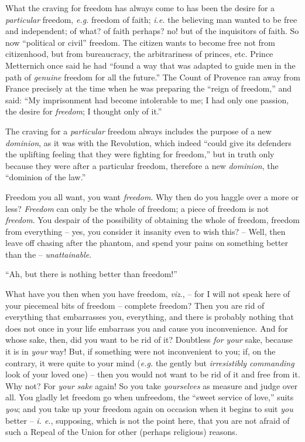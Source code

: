 \documentclass[12pt,a4paper]{book}
\begin{document}
What the craving for freedom has always come to has been the desire for a 
\textit{particular} freedom, \textit{e.g.} freedom of faith; \textit{i.e.} 
the believing man wanted to be free and independent; of what? of faith 
perhaps? no! but of the inquisitors of faith. So now ``political or civil'' 
freedom. The citizen wants to become free not from citizenhood, but from 
bureaucracy, the arbitrariness of princes, etc. Prince Metternich once said he 
had ``found a way that was adapted to guide men in the path of 
\textit{genuine} freedom for all the future.'' The Count of Provence ran away 
from France precisely at the time when he was preparing the ``reign of 
freedom,'' and said: ``My imprisonment had become intolerable to me; I had 
only one passion, the desire for \textit{freedom}; I thought only of it.''

The craving for a \textit{particular} freedom always includes the purpose of a 
new \textit{dominion}, as it was with the Revolution, which indeed ``could 
give its defenders the uplifting feeling that they were fighting for 
freedom,'' but in truth only because they were after a particular freedom, 
therefore a new \textit{dominion}, the ``dominion of the law.''

Freedom you all want, you want \textit{freedom}. Why then do you haggle over a 
more or less? \textit{Freedom} can only be the whole of freedom; a piece of 
freedom is not \textit{freedom}. You despair of the possibility of obtaining 
the whole of freedom, freedom from everything -- yes, you consider it insanity 
even to wish this? -- Well, then leave off chasing after the phantom, and 
spend your pains on something better than the -- \textit{unattainable}.

``Ah, but there is nothing better than freedom!''

What have you then when you have freedom, \textit{viz}., -- for I will not 
speak here of your piecemeal bits of freedom -- complete freedom? Then you are 
rid of everything that embarrasses you, everything, and there is probably 
nothing that does not once in your life embarrass you and cause you 
inconvenience. And for whose sake, then, did you want to be rid of it? 
Doubtless \textit{for your} sake, because it is in \textit{your} way! But, if 
something were not inconvenient to you; if, on the contrary, it were quite to 
your mind (\textit{e.g.} the gently but \textit{irresistibly commanding} look 
of your loved one) -- then you would not want to be rid of it and free from 
it. Why not? For \textit{your sake} again! So you take \textit{yourselves} as 
measure and judge over all. You gladly let freedom go when unfreedom, the 
``sweet service of love,'' suits \textit{you}; and you take up your freedom 
again on occasion when it begins to suit \textit{you} better -- \textit{i. 
e.}, supposing, which is not the point here, that you are not afraid of such a 
Repeal of the Union for other (perhaps religious) reasons.
\end{document}
